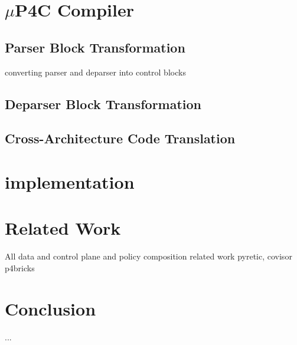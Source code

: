 \documentclass[10pt,sigconf,letterpaper,anonymous]{acmart}
\begin{document}
\section{$\mu$P4C Compiler}
\label{section-mp4c-compiler}

\subsection{Parser Block Transformation}
converting parser and deparser into control blocks

\subsection{Deparser Block Transformation}

\subsection{Cross-Architecture Code Translation}




\section{implementation}

\section{Related Work}

All data and control plane and policy composition related work 
pyretic, covisor
p4bricks
\section{Conclusion}

\begin{acks}
...
\end{acks}




\end{document}
